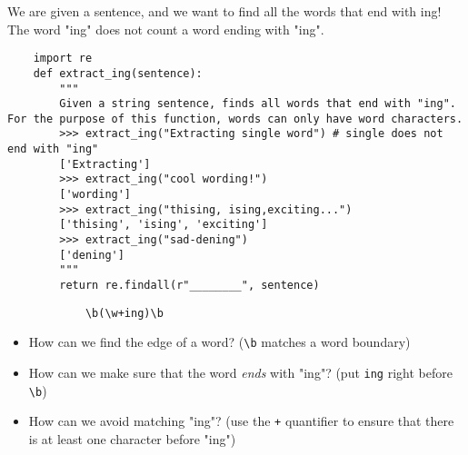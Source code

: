 \begin{blocksection}
    \question We are given a sentence, and we want to find all the words that end with ing! The word "ing" does not count a word ending with "ing". 
    
    \begin{lstlisting}
    import re
    def extract_ing(sentence):
        """
        Given a string sentence, finds all words that end with "ing". For the purpose of this function, words can only have word characters.
        >>> extract_ing("Extracting single word") # single does not end with "ing"
        ['Extracting']
        >>> extract_ing("cool wording!")
        ['wording']
        >>> extract_ing("thising, ising,exciting...")
        ['thising', 'ising', 'exciting']
        >>> extract_ing("sad-dening")
        ['dening']
        """
        return re.findall(r"________", sentence)
    \end{lstlisting}
    
    \begin{solution}[2in]
        \begin{lstlisting}
            \b(\w+ing)\b
        \end{lstlisting}
    \end{solution}
    \end{blocksection}

    \begin{guide}
        \begin{blocksection}
            \begin{itemize}
                \item How can we find the edge of a word? (\lstinline{\b} matches a word boundary)
                \item How can we make sure that the word \textit{ends} with "ing"? (put \lstinline{ing} right before \lstinline{\b})
                \item How can we avoid matching "ing"? (use the \lstinline{+} quantifier to ensure that there is at least one character before "ing")
            \end{itemize}
        \end{blocksection}
    \end{guide}
    
